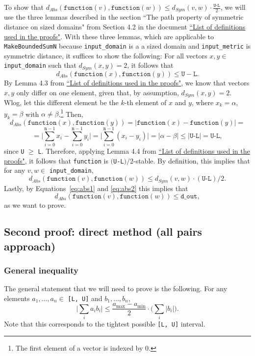 \documentclass[11pt,a4paper]{article}
\theoremstyle{definition}
\newcommand{\dout}{\texttt{d\_out}}
\newcommand{\function}{\texttt{function}}
\newcommand{\silvia}[1]{{ {\color{blue}{(silvia)~#1}}}}
\begin{document}
To show that $d_{Abs}(\function(v), \function(w)) \leq d_{Sym}(v, w) \cdot \frac{\texttt{U-L}}{2}$, we will use the three lemmas described in the section ``The path property of symmetric distance on sized domains" from Section 4.2 in the document \href{https://www.overleaf.com/project/60d214e390b337703d200982}{``List of definitions used in the proofs"}. With these three lemmas, which are applicable to \texttt{MakeBoundedSumN} because \texttt{input\_domain} is a a sized domain and \texttt{input\_metric} is symmetric distance, it suffices to show the following: For all vectors $x, y \in$ \texttt{input\_domain} such that $d_{Sym}(x, y) = 2$, it follows that 
\[
d_{Abs}(\texttt{function}(x), \texttt{function}(y)) \leq \texttt{U} - \texttt{L}.
\]
By Lemma 4.3 from \href{https://www.overleaf.com/project/60d214e390b337703d200982}{``List of definitions used in the proofs"}, we know that vectors $x, y$ only differ on one element, given that, by assumption, $d_{Sym}(x, y) = 2$. Wlog, let this different element be the $k$-th element of $x$ and $y$, where $x_k = \alpha$, $y_k = \beta$ with $\alpha \neq \beta$.\footnote{The first element of a vector is indexed by 0.} Then,
\[
    d_{Abs}(\texttt{function}(x), \texttt{function}(y)) = |\texttt{function}(x) - \texttt{function}(y)| = 
\]
\[
    = \Big|\sum_{i=0}^{\texttt{n}-1}x_i - \sum_{i=0}^{\texttt{n}-1}y_i\Big| = \Big| \sum_{i=0}^{\texttt{n}-1} (x_i - y_i) \Big| = |\alpha - \beta| \leq |\texttt{U-L}| = \texttt{U-L},
\]
since \texttt{U} $\geq$ \texttt{L}. Therefore, applying Lemma 4.4 from \href{https://www.overleaf.com/project/60d214e390b337703d200982}{``List of definitions used in the proofs"}, it follows that \texttt{function} is $($\texttt{U-L}$)/2$-stable. By definition, this implies that for any $v, w \in$ \texttt{input\_domain},
\[
    d_{Abs}(\texttt{function}(v), \texttt{function}(w)) \leq d_{Sym}(v, w) \cdot (\texttt{U-L})/2.
\]
Lastly, by Equations~\ref{eq:abs1} and \ref{eq:abs2} this implies that
\[
    d_{Abs}(\function(v), \function(w)) \leq \dout,
\]
as we want to prove.

\silvia{Flag: this will be updated to the more general notion of path property (through shortest path metric on a graph), but this matches the current version of the proofs document.}

\subsection{Second proof: direct method (all pairs approach)}
\subsubsection{General inequality}
The general statement that we will need to prove is the following. For any elements $a_1, \ldots, a_n \in$ \texttt{[L, U]} and $b_1, \ldots, b_n$, 
\[
    \Big|\sum_i a_ib_i\Big| \leq \dfrac{a_{\max}-a_{\min}}{2} \cdot \Big(\sum_i |b_i| \Big).
\]
Note that this corresponds to the tightest possible \texttt{[L, U]} interval.
\end{document}
